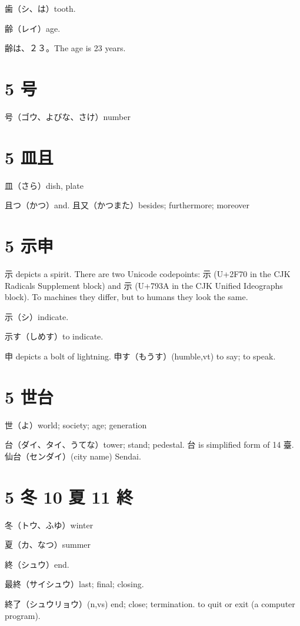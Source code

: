 歯（シ、は）tooth.

齢（レイ）age.

齢は、２３。The age is 23 years.

\section{5 号}

号（ゴウ、よびな、さけ）number

\section{5 皿且}

皿（さら）dish, plate

且つ（かつ）and.
且又（かつまた）besides; furthermore; moreover

\section{5 示申}

示 depicts a spirit.
There are two Unicode codepoints:
⽰ (U+2F70 in the CJK Radicals Supplement block)
and 示 (U+793A in the CJK Unified Ideographs block).
To machines they differ,
but to humans they look the same.

示（シ）indicate.

示す（しめす）to indicate.

申 depicts a bolt of lightning.
申す（もうす）(humble,vt) to say; to speak.

\section{5 世台}

世（よ）world; society; age; generation

台（ダイ、タイ、うてな）tower; stand; pedestal.
台 is simplified form of 14 臺.
仙台（センダイ）(city name) Sendai.

\section{5 冬 10 夏 11 終}

冬（トウ、ふゆ）winter

夏（カ、なつ）summer

終（シュウ）end.

最終（サイシュウ）last; final; closing.

終了（シュウリョウ）(n,vs)
end; close; termination.
to quit or exit (a computer program).

